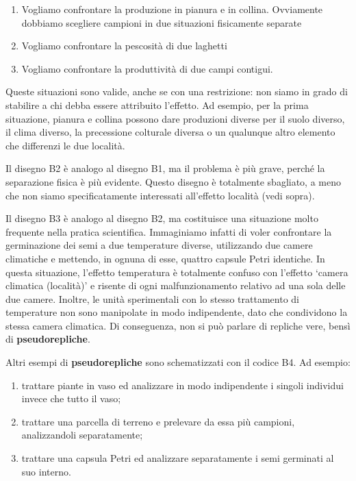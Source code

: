 \documentclass[a4paper,12pt,oneside]{book}
\providecommand{\tightlist}{%
  \setlength{\itemsep}{0pt}\setlength{\parskip}{0pt}}
\begin{document}
\begin{enumerate}
\def\labelenumi{\arabic{enumi}.}
\tightlist
\item
  Vogliamo confrontare la produzione in pianura e in collina. Ovviamente dobbiamo scegliere campioni in due situazioni fisicamente separate
\item
  Vogliamo confrontare la pescosità di due laghetti
\item
  Vogliamo confrontare la produttività di due campi contigui.
\end{enumerate}

Queste situazioni sono valide, anche se con una restrizione: non siamo in grado di stabilire a chi debba essere attribuito l'effetto. Ad esempio, per la prima situazione, pianura e collina possono dare produzioni diverse per il suolo diverso, il clima diverso, la precessione colturale diversa o un qualunque altro elemento che differenzi le due località.

Il disegno B2 è analogo al disegno B1, ma il problema è più grave, perché la separazione fisica è più evidente. Questo disegno è totalmente sbagliato, a meno che non siamo specificatamente interessati all'effetto località (vedi sopra).

Il disegno B3 è analogo al disegno B2, ma costituisce una situazione molto frequente nella pratica scientifica. Immaginiamo infatti di voler confrontare la germinazione dei semi a due temperature diverse, utilizzando due camere climatiche e mettendo, in ognuna di esse, quattro capsule Petri identiche. In questa situazione, l'effetto temperatura è totalmente confuso con l'effetto `camera climatica (località)' e risente di ogni malfunzionamento relativo ad una sola delle due camere. Inoltre, le unità sperimentali con lo stesso trattamento di temperature non sono manipolate in modo indipendente, dato che condividono la stessa camera climatica. Di conseguenza, non si può parlare di repliche vere, bensì di \textbf{pseudorepliche}.

Altri esempi di \textbf{pseudorepliche} sono schematizzati con il codice B4. Ad esempio:

\begin{enumerate}
\def\labelenumi{\arabic{enumi}.}
\tightlist
\item
  trattare piante in vaso ed analizzare in modo indipendente i singoli individui invece che tutto il vaso;
\item
  trattare una parcella di terreno e prelevare da essa più campioni, analizzandoli separatamente;
\item
  trattare una capsula Petri ed analizzare separatamente i semi germinati al suo interno.
\end{enumerate}
\end{document}
